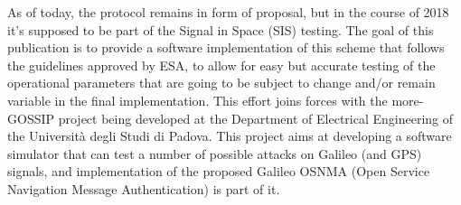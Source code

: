 As of today, the protocol remains in form of proposal, but in the course of 2018
it's supposed to be part of the Signal in Space (SIS) testing. The goal of this
publication is to provide a software implementation of this scheme that follows
the guidelines approved by ESA, to allow for easy but accurate testing of the
operational parameters that are going to be subject to change and/or remain
variable in the final implementation. This effort joins forces with the
more-GOSSIP project being developed at the Department of Electrical Engineering
of the Università degli Studi di Padova. This project aims at developing a
software simulator that can test a number of possible attacks on Galileo (and
GPS) signals, and implementation of the proposed Galileo OSNMA (Open Service
Navigation Message Authentication) is part of it.
